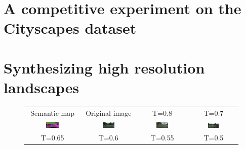 
\section{A competitive experiment on the Cityscapes dataset} %
\section{Synthesizing high resolution landscapes} %


\begin{figure}
    \tiny
    \centering
    \setlength\tabcolsep{-2pt}
    \begin{tabular}{cccc}
        Semantic map & Original image & T=0.8 & T=0.7 \\
        \includegraphics[width=0.25\textwidth]{Chapters/figures/experiments/seg_stop/0_1.0_seg_mask.png} &  \includegraphics[width=0.25\textwidth]{Chapters/figures/experiments/seg_stop/0_1.0_original.png} & \includegraphics[width=0.25\textwidth]{Chapters/figures/experiments/seg_stop/0_0.8_cond_sample.png} & \includegraphics[width=0.25\textwidth]{Chapters/figures/experiments/seg_stop/0_0.7_cond_sample.png} \\
        T=0.65 & T=0.6 & T=0.55 & T=0.5\\

\end{tabular}
\end{figure}
